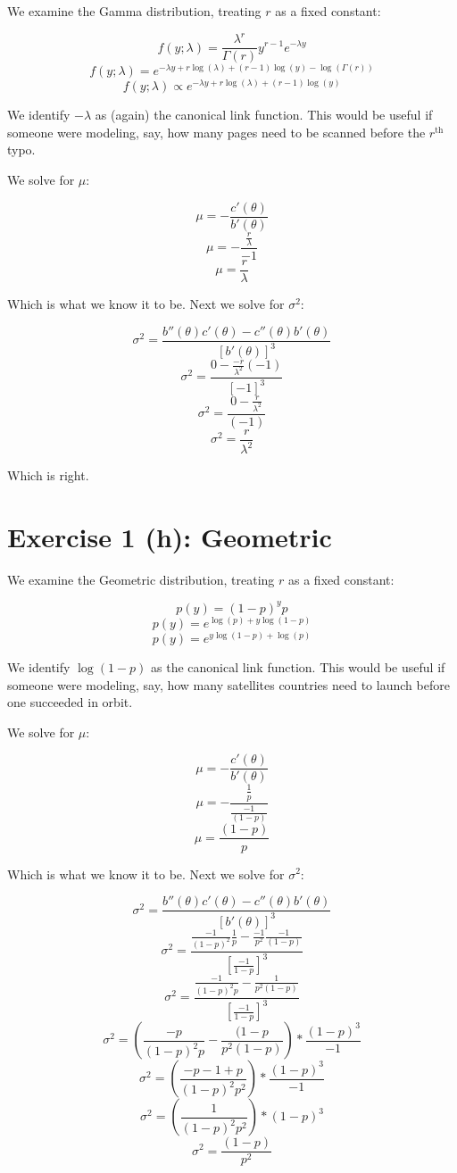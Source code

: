 \documentclass[12pt,a4paper]{article}
\begin{document}
We examine the Gamma distribution, treating $r$ as a fixed constant: 

$$f(y; \lambda) = \frac{\lambda^{r}}{\Gamma(r)} y^{r-1} e^{-\lambda y}$$
$$f(y; \lambda) = e^{-\lambda y + r\log(\lambda) + (r-1)\log(y) - \log(\Gamma(r))}$$
$$f(y; \lambda) \propto e^{-\lambda y + r\log(\lambda) + (r-1)\log(y)}$$

We identify $-\lambda$ as (again) the canonical link function. This would be useful if someone were modeling, say, how many pages need to be scanned before the $r^{\text{th}}$ typo.

\newpage

We solve for $\mu$: 

$$\mu = - \frac{c'(\theta)}{b'(\theta)}$$
$$\mu = - \frac{\frac{r}{\lambda}}{-1}$$
$$\mu = \frac{r}{\lambda}$$

Which is what we know it to be. Next we solve for $\sigma^{2}$: 

$$\sigma^{2} = \frac{b''(\theta)c'(\theta) - c''(\theta)b'(\theta)}{[b'(\theta)]^{3}}$$
$$\sigma^{2} = \frac{0 - \frac{-r}{\lambda^{2}}(-1)}{[-1]^{3}}$$
$$\sigma^{2} = \frac{0 - \frac{r}{\lambda^{2}}}{(-1)}$$
$$\sigma^{2} = \frac{r}{\lambda^{2}}$$

Which is right. 

\newpage
\section{Exercise 1 (h): Geometric}

We examine the Geometric distribution, treating $r$ as a fixed constant: 

$$p(y) = (1-p)^{y}p$$
$$p(y) = e^{\log(p) + y\log(1-p)}$$
$$p(y) = e^{y\log(1-p) + \log(p)}$$

We identify $\log(1-p)$ as the canonical link function. This would be useful if someone were modeling, say, how many satellites countries need to launch before one succeeded in orbit.

\newpage

We solve for $\mu$: 

$$\mu = - \frac{c'(\theta)}{b'(\theta)}$$
$$\mu = - \frac{\frac{1}{p}}{\frac{-1}{(1-p)}}$$
$$\mu = \frac{(1-p)}{p}$$

Which is what we know it to be. Next we solve for $\sigma^{2}$: 

$$\sigma^{2} = \frac{b''(\theta)c'(\theta) - c''(\theta)b'(\theta)}{[b'(\theta)]^{3}}$$
$$\sigma^{2} = \frac{\frac{-1}{(1-p)^2}\frac{1}{p} - \frac{-1}{p^2} \frac{-1}{(1-p)}}{[\frac{-1}{1-p}]^{3}}$$
$$\sigma^{2} = \frac{\frac{-1}{(1-p)^2p} - \frac{1}{p^2(1-p)}}{[\frac{-1}{1-p}]^{3}}$$
$$\sigma^{2} = \left( \frac{-p}{(1-p)^2p} - \frac{(1-p}{p^2(1-p)}\right) * \frac{(1-p)^{3}}{-1}$$
$$\sigma^{2} = \left( \frac{-p-1+p}{(1-p)^2p^2}\right) * \frac{(1-p)^{3}}{-1}$$
$$\sigma^{2} = \left( \frac{1}{(1-p)^2p^2}\right) * (1-p)^{3}$$
$$\sigma^{2} = \frac{(1-p)}{p^2}$$
\end{document}

